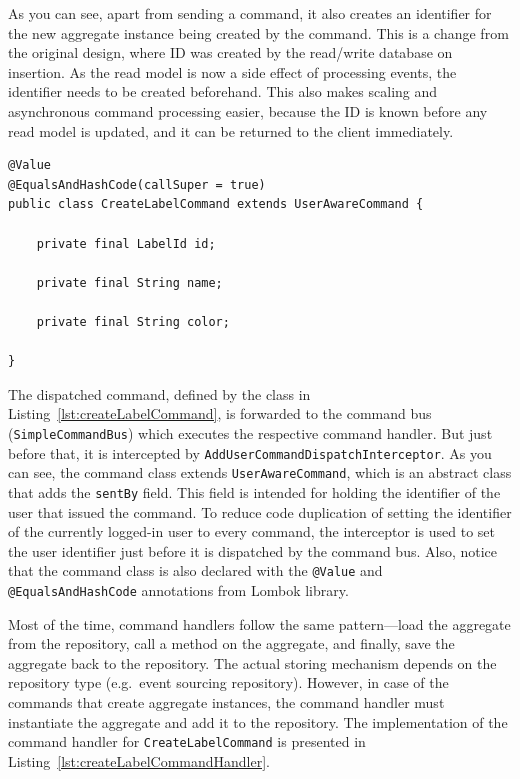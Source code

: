 \documentclass{book}
\begin{document}
As you can see, apart from sending a command, it also creates an
identifier for the new aggregate instance being created by the command.
This is a change from the original design, where ID was created by the
read/write database on insertion. As the read model is now a side effect
of processing events, the identifier needs to be created beforehand.
This also makes scaling and asynchronous command processing easier,
because the ID is known before any read model is updated, and it can be
returned to the client immediately.

\begin{lstlisting}[caption={The \texttt{CreateLabelCommand} class},label={lst:createLabelCommand},captionpos=b,float,floatplacement=H]
@Value
@EqualsAndHashCode(callSuper = true)
public class CreateLabelCommand extends UserAwareCommand {

    private final LabelId id;

    private final String name;

    private final String color;

}
\end{lstlisting}

The dispatched command, defined by the class in Listing~\ref{lst:createLabelCommand}, is forwarded to the command bus
(\texttt{SimpleCommandBus}) which executes the respective command
handler. But just before that, it is intercepted by
\texttt{AddUserCommandDispatchInterceptor}. As you can see, the command
class extends \texttt{UserAwareCommand}, which is an abstract class that
adds the \texttt{sentBy} field. This field is intended for holding the
identifier of the user that issued the command. To reduce code
duplication of setting the identifier of the currently logged-in user to
every command, the interceptor is used to set the user identifier just
before it is dispatched by the command bus. Also, notice that the
command class is also declared with the \texttt{@Value} and
\texttt{@EqualsAndHashCode} annotations from Lombok library.

Most of the time, command handlers follow the same pattern---load the
aggregate from the repository, call a method on the aggregate, and
finally, save the aggregate back to the repository. The actual storing
mechanism depends on the repository type (e.g.~event sourcing
repository). However, in case of the commands that create aggregate
instances, the command handler must instantiate the aggregate and add it
to the repository. The implementation of the command handler for
\texttt{CreateLabelCommand} is presented in Listing~\ref{lst:createLabelCommandHandler}.
\end{document}
